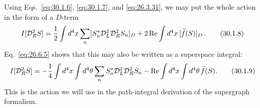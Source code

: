Using Eqs.~\eqref{eq:30.1.6}, \eqref{eq:30.1.7}, and
\eqref{eq:26.3.31}, we may put the whole action in the form of a \(D\)-term
\begin{equation}
  I[\mathcal{D}_R^2S]
  =\frac12\int d^4x\sum_n
    [S_n^*\mathcal{D}_L^2\mathcal{D}_R^2S_n]_D
   +2\operatorname{Re}\int d^4x\,[\widetilde f(S)]_D\,.
  \tag{30.1.8}\label{eq:30.1.8}
\end{equation}
Eq.~\eqref{eq:26.6.5} shows that this may also be written as a superspace
integral:
\begin{equation}
  I[\mathcal{D}_R^2S]
  =-\frac14\int d^4x\int d^4\theta
    \sum_nS_n^*\mathcal{D}_L^2\mathcal{D}_R^2S_n
   -\operatorname{Re}\int d^4x\int d^4\theta\,\widetilde f(S).
  \tag{30.1.9}\label{eq:30.1.9}
\end{equation}
This is the action we will use in the path-integral derivation of the
supergraph formalism.
